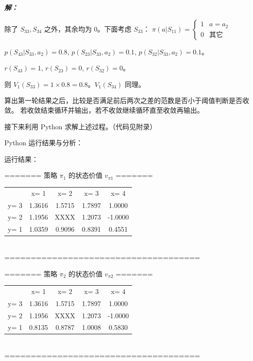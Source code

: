 \documentclass[12pt, a4paper]{article}
\newenvironment{solution}{
	\par\vspace{0.2cm}\noindent\textbf{\color{themecolor} \textit{解：}}
}{
	\par\vspace{0.5cm} %
}
\begin{document}
\begin{solution}
		除了 $S_{33}, S_{34}$ 之外，其余均为 $0$。下面考虑 $S_{33}$：
		$\pi(a|S_{11}) = \begin{cases} 1 & a=a_2 \\ 0 & \text{其它} \end{cases}$
		
		$p(S_{43}|S_{33}, a_2) = 0.8$, $p(S_{23}|S_{33}, a_2) = 0.1$, $p(S_{32}|S_{33}, a_2) = 0.1$。
		
		$r(S_{43}) = 1$, $r(S_{23}) = 0$, $r(S_{32}) = 0$。
		
		则 $V_1(S_{33}) = 1 \times 0.8 = 0.8$。$V_1(S_{34})$ 同理。
		
		算出第一轮结果之后，比较是否满足前后两次之差的范数是否小于阈值判断是否收敛。
		若收敛结束循环并输出，若不收敛继续循环直至收敛再输出。
		
		接下来利用 Python 求解上述过程。（代码见附录）
		\vspace{1.0cm}
		
		Python 运行结果与分析：
		
		运行结果：
		\vspace{0.5cm}
		
		{
			\ttfamily
			\noindent
			======= 策略 $\pi_1$ 的状态价值 $v_{\pi1}$ ======= \\[5pt]
			\begin{tabular}{@{} l c c c c @{}} %
				& x= 1   & x= 2   & x= 3   & x= 4    \\
				y= 3  & 1.3616 & 1.5715 & 1.7897 &  1.0000 \\
				y= 2  & 1.1956 &  XXXX  & 1.2073 & -1.0000 \\
				y= 1  & 1.0359 & 0.9096 & 0.8391 &  0.4551 \\
			\end{tabular} \\[5pt]
			=====================================
			
			\vspace{1.0cm} %
			
			\noindent
			======= 策略 $\pi_2$ 的状态价值 $v_{\pi2}$ ======= \\[5pt]
			\begin{tabular}{@{} l c c c c @{}}
				& x= 1   & x= 2   & x= 3   & x= 4    \\
				y= 3  & 1.3616 & 1.5715 & 1.7897 &  1.0000 \\
				y= 2  & 1.1956 &  XXXX  & 1.2073 & -1.0000 \\
				y= 1  & 0.8135 & 0.8787 & 1.0008 &  0.5830 \\
			\end{tabular} \\[5pt]
			=====================================
		} %
		

\end{solution}
\end{document}
